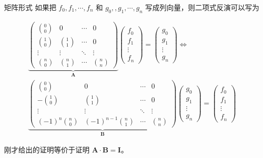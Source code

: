 \documentclass[UTF8]{beamer}
\begin{document}
    \begin{frame}{矩阵形式}
        如果把 $f_0,f_1,\cdots, f_n$ 和 $g_0,,g_1,\cdots, g_n$ 写成列向量，则二项式反演可以写为

        \begin{gather*}
        \underbrace{
        \begin{pmatrix}
        \binom{0}{0}&0&\cdots&0\\
        \binom{1}{0}&\binom{1}{1}&\cdots&0\\
        \vdots&\vdots&\ddots&\vdots\\
        \binom{n}{0}&\binom{n}{1}&\cdots&\binom{n}{n}
        \end{pmatrix}
        }_{\boldsymbol A}
        \begin{pmatrix}
            f_0\\
            f_1\\
            \vdots\\
            f_n
        \end{pmatrix}=\begin{pmatrix}
            g_0\\
            g_1\\
            \vdots\\
            g_n
        \end{pmatrix}
        \iff\\
        \underbrace{
        \begin{pmatrix}
        \binom{0}{0}&0&\cdots&0\\
        -\binom{1}{0}&\binom{1}{1}&\cdots&0\\
        \vdots&\vdots&\ddots&\vdots\\
        (-1)^{n}\binom{n}{0}&(-1)^{n-1}\binom{n}{1}&\cdots&\binom{n}{n}
        \end{pmatrix}
        }_{\boldsymbol B}
        \begin{pmatrix}
            g_0\\
            g_1\\
            \vdots\\
            g_n
        \end{pmatrix}=\begin{pmatrix}
            f_0\\
            f_1\\
            \vdots\\
            f_n
        \end{pmatrix}
    \end{gather*}

        刚才给出的证明等价于证明 $\boldsymbol A \cdot \boldsymbol B=\boldsymbol I$。
    \end{frame}
\end{document}
